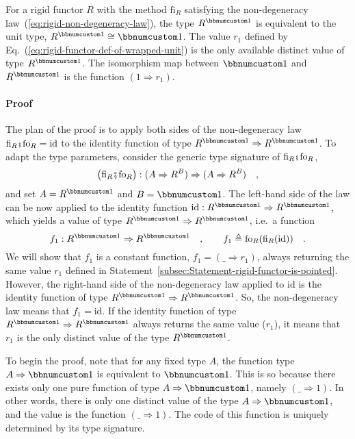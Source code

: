 For a rigid functor $R$ with the method $\text{fi}_{R}$ satisfying
the non-degeneracy law~(\ref{eq:rigid-non-degeneracy-law}), the
type $R^{\bbnum 1}$ is equivalent to the unit type, $R^{\bbnum 1}\cong\bbnum 1$.
The value $r_{1}$ defined by Eq.~(\ref{eq:rigid-functor-def-of-wrapped-unit})
is the only available distinct value of type $R^{\bbnum 1}$. The
isomorphism map between $\bbnum 1$ and $R^{\bbnum 1}$ is the function
$\left(1\Rightarrow r_{1}\right)$.

\paragraph{Proof}

The plan of the proof is to apply both sides of the non-degeneracy
law $\text{fi}_{R}\bef\text{fo}_{R}=\text{id}$ to the identity function
of type $R^{\bbnum 1}\Rightarrow R^{\bbnum 1}$. To adapt the type
parameters, consider the generic type signature of $\text{fi}_{R}\bef\text{fo}_{R}$,
\[
\big(\text{fi}_{R}\bef\text{fo}_{R}\big):(A\Rightarrow R^{B})\Rightarrow(A\Rightarrow R^{B})\quad,
\]
and set $A=R^{\bbnum 1}$ and $B=\bbnum 1$. The left-hand side of
the law can be now applied to the identity function $\text{id}:R^{\bbnum 1}\Rightarrow R^{\bbnum 1}$,
which yields a value of type $R^{\bbnum 1}\Rightarrow R^{\bbnum 1}$,
i.e.~a function 
\[
f_{1}:R^{\bbnum 1}\Rightarrow R^{\bbnum 1}\quad,\quad\quad f_{1}\triangleq\text{fo}_{R}(\text{fi}_{R}(\text{id}))\quad.
\]
We will show that $f_{1}$ is a constant function, $f_{1}=(\_\Rightarrow r_{1})$,
always returning the same value $r_{1}$ defined in Statement~\ref{subsec:Statement-rigid-functor-is-pointed}.
However, the right-hand side of the non-degeneracy law applied to
$\text{id}$ is the identity function of type $R^{\bbnum 1}\Rightarrow R^{\bbnum 1}$.
So, the non-degeneracy law means that $f_{1}=\text{id}$. If the identity
function of type $R^{\bbnum 1}\Rightarrow R^{\bbnum 1}$ always returns
the same value ($r_{1}$), it means that $r_{1}$ is the only distinct
value of the type $R^{\bbnum 1}$.

To begin the proof, note that for any fixed type $A$, the function
type $A\Rightarrow\bbnum 1$ is equivalent to $\bbnum 1$. This is
so because there exists only one pure function of type $A\Rightarrow\bbnum 1$,
namely $(\_\Rightarrow1)$. In other words, there is only one distinct
value of the type $A\Rightarrow\bbnum 1$, and the value is the function
$\left(\_\Rightarrow1\right)$. The code of this function is uniquely
determined by its type signature.

